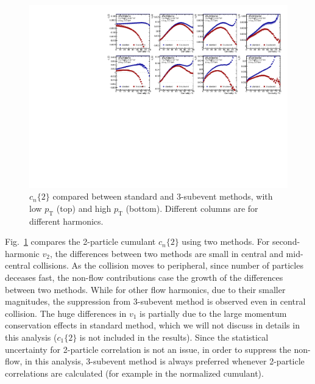 \begin{figure}[H]
\centering
\includegraphics[width=.95\linewidth]{figs/sec_result/forQM/mtd_c2.pdf}
\caption{$c_n\{2\}$ compared between standard and 3-subevent methods, with low $p_\text{T}$ (top) and high $p_\text{T}$ (bottom). Different columns are for different harmonics.}
\label{fig:result_mtd_c2}
\end{figure}
Fig.~\ref{fig:result_mtd_c2} compares the 2-particle cumulant $c_n\{2\}$ using two methods. For second-harmonic $v_2$, the differences between two methods are small in central and mid-central collisions. As the collision moves to peripheral, since number of particles deceases fast, the non-flow contributions case the growth of the differences between two methods. While for other flow harmonics, due to their smaller magnitudes, the suppression from 3-subevent method is observed even in central collision. The huge differences in $v_1$ is partially due to the large momentum conservation effects in standard method, which we will not discuss in details in this analysis ($c_1\{2\}$ is not included in the results). Since the statistical uncertainty for 2-particle correlation is not an issue, in order to suppress the non-flow, in this analysis, 3-subevent method is always preferred whenever 2-particle correlations are calculated (for example in the normalized cumulant).

